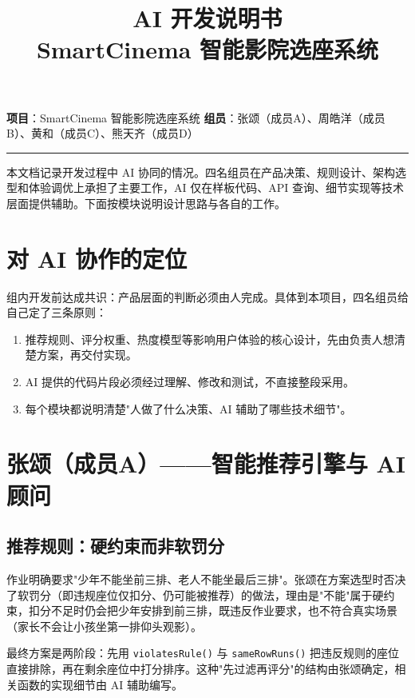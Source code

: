 \documentclass[12pt,a4paper]{ctexart}
\title{\vspace{-1.5cm}\textbf{AI 开发说明书}\\[0.3em]\large SmartCinema 智能影院选座系统}
\author{}
\date{}
\begin{document}
\maketitle
\vspace{-1.5cm}

\noindent\textbf{项目}：SmartCinema 智能影院选座系统\quad
\textbf{组员}：张颂（成员A）、周皓洋（成员B）、黄和（成员C）、熊天齐（成员D）

\vspace{0.4em}
\noindent\rule{\textwidth}{0.4pt}

\vspace{0.3em}
本文档记录开发过程中 AI 协同的情况。四名组员在产品决策、规则设计、架构选型和体验调优上承担了主要工作，AI 仅在样板代码、API 查询、细节实现等技术层面提供辅助。下面按模块说明设计思路与各自的工作。

\section{对 AI 协作的定位}

组内开发前达成共识：产品层面的判断必须由人完成。具体到本项目，四名组员给自己定了三条原则：

\begin{enumerate}
  \item 推荐规则、评分权重、热度模型等影响用户体验的核心设计，先由负责人想清楚方案，再交付实现。
  \item AI 提供的代码片段必须经过理解、修改和测试，不直接整段采用。
  \item 每个模块都说明清楚"人做了什么决策、AI 辅助了哪些技术细节"。
\end{enumerate}

\section{张颂（成员A）——智能推荐引擎与 AI 顾问}

\subsection{推荐规则：硬约束而非软罚分}

作业明确要求"少年不能坐前三排、老人不能坐最后三排"。张颂在方案选型时否决了软罚分（即违规座位仅扣分、仍可能被推荐）的做法，理由是"不能"属于硬约束，扣分不足时仍会把少年安排到前三排，既违反作业要求，也不符合真实场景（家长不会让小孩坐第一排仰头观影）。

最终方案是两阶段：先用 \texttt{violatesRule()} 与 \texttt{sameRowRuns()} 把违反规则的座位直接排除，再在剩余座位中打分排序。这种"先过滤再评分"的结构由张颂确定，相关函数的实现细节由 AI 辅助编写。
\end{document}
